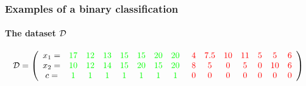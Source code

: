 \begin{frame}
  \frametitle{Examples of a binary classification}
  \framesubtitle{The dataset $\mathcal{D}$}
\begin{displaymath}
\mathcal{D} = \left( 
{\color{green}
  \begin{array}{cccccccc}
    {\color{black} x_1=} &17 &12 &13 &15 &15 &20 &20\\
    {\color{black} x_2=} &10 &12 &14 &15 &20 &15 &20\\
    {\color{black} {c} =} &1 &1 &1 &1 &1 &1 &1\\
    
  \end{array} 
}
\right.
\left.
{\color{red}
  \begin{array}{ccccccc}
4& 7.5& 10& 11& 5& 5& 6\\
8 &5 &0 &5 &0 &10& 6\\
0 &0 &0 &0 &0 &0 &0\\
  \end{array} 
}
\right)
\end{displaymath}
  \begin{center}
  \end{center}
\end{frame}


